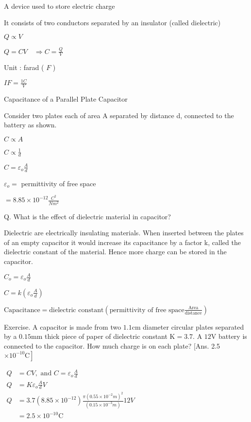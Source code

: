 \documentclass{extarticle}
\begin{document}
A device used to store electric charge

It consists of two conductors separated by an
insulator (called dielectric)

$Q \propto V$

$Q=C V \quad \Rightarrow C=\frac{Q}{V}$

Unit : farad ( $F$ )

$I F=\frac{1 C}{V}$




Capacitance of a Parallel Plate Capacitor

Consider two plates each of area A separated by
distance d, connected to the battery as shown.


$C \propto A$

$C \propto \frac{1}{d}$

$C=\varepsilon_{o} \frac{A}{d}$

$\varepsilon_{o}=$ permittivity of free space

$=8.85 \times 10^{-12} \frac{C^{2}}{N m^{2}}$







Q. What is the effect of dielectric material in capacitor?

Dielectric are electrically insulating materials.
When inserted between the plates of an empty capacitor it
would increase its capacitance by a factor k, called the
dielectric constant of the material. Hence more charge can
be stored in the capacitor.

$C_{o}=\varepsilon_{o} \frac{A}{d}$

$C=k\left(\varepsilon_{o} \frac{A}{d}\right)$

$\text{Capacitance}=\text{dielectric constant}\left(\text{permittivity of free space} \frac{\text{Area}}{\text{distance}}\right)$






Exercise. A capacitor is made from two $1.1 \mathrm{cm}$ diameter circular plates separated by a $0.15 \mathrm{mm}$ thick piece of paper of dielectric constant $\mathrm{K}=3.7 .$ A $12 \mathrm{V}$ battery is connected to the capacitor. How much charge is on each plate? [Ans. 2.5 $\left.\times 10^{-10} \mathrm{C}\right]$



$\begin{aligned} Q &=C V, \text { and } C=\varepsilon_{o} \frac{A}{d} \\ Q &=K \varepsilon_{o} \frac{A}{d} V \\ Q &=3.7\left(8.85 \times 10^{-12}\right)\frac{\pi\left(0.55 \times 10^{-2} m\right)^{2}}{\left(0.15 \times 10^{-3} m\right)}{12 V} \\ &=2.5 \times 10^{-10} \mathrm{C} \end{aligned}$
\end{document}
